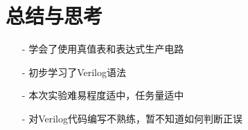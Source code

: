 \documentclass{article}
\begin{document}
    \section{总结与思考}
	\begin{enumerate}
        \item [-]学会了使用真值表和表达式生产电路
        \item [-]初步学习了Verilog语法
        \item [-]本次实验难易程度适中，任务量适中
        \item [-]对Verilog代码编写不熟练，暂不知道如何判断正误
    \end{enumerate}
\end{document}
